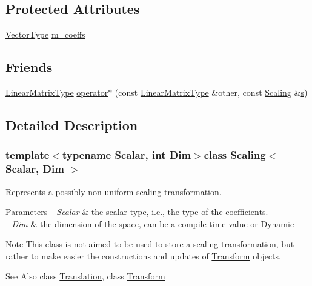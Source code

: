 \subsection*{Protected Attributes}
\begin{DoxyCompactItemize}
\item 
\hyperlink{class_scaling_a48ec70d6974c8d2c90ad7ca7a5c16f97}{Vector\-Type} \hyperlink{class_scaling_a984c1f1fcb36c12898fa2008e5d9f686}{m\-\_\-coeffs}
\end{DoxyCompactItemize}
\subsection*{Friends}
\begin{DoxyCompactItemize}
\item 
\hyperlink{class_scaling_a6c8c9048c2ccf7378efb46c075ec7333}{Linear\-Matrix\-Type} \hyperlink{class_scaling_a2334085ff389c256ae6cc9abb6c7f447}{operator$\ast$} (const \hyperlink{class_scaling_a6c8c9048c2ccf7378efb46c075ec7333}{Linear\-Matrix\-Type} \&other, const \hyperlink{class_scaling}{Scaling} \&\hyperlink{glext_8h_ad585a1393cfa368fa9dc3d8ebff640d5}{s})
\end{DoxyCompactItemize}


\subsection{Detailed Description}
\subsubsection*{template$<$typename Scalar, int Dim$>$class Scaling$<$ Scalar, Dim $>$}

Represents a possibly non uniform scaling transformation. 


\begin{DoxyParams}{Parameters}
{\em \-\_\-\-Scalar} & the scalar type, i.\-e., the type of the coefficients. \\
\hline
{\em \-\_\-\-Dim} & the dimension of the space, can be a compile time value or Dynamic\\
\hline
\end{DoxyParams}
\begin{DoxyNote}{Note}
This class is not aimed to be used to store a scaling transformation, but rather to make easier the constructions and updates of \hyperlink{class_transform}{Transform} objects.
\end{DoxyNote}
\begin{DoxySeeAlso}{See Also}
class \hyperlink{class_translation}{Translation}, class \hyperlink{class_transform}{Transform} 
\end{DoxySeeAlso}


